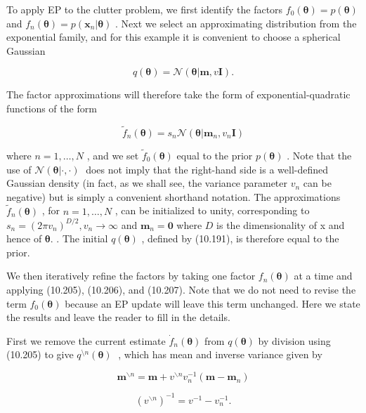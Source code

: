 \documentclass[
  10
]{article}
\begin{document}
To apply EP to the clutter problem, we first identify the factors
\(f _ { 0 } ( \pmb { \theta } ) = p ( \pmb { \theta } )\) and
\(f _ { n } ( \pmb { \theta } ) = p ( \mathbf x _ { n } | \pmb \theta )\)
. Next we select an approximating distribution from the exponential
family, and for this example it is convenient to choose a spherical
Gaussian

\[
q (\boldsymbol {\theta}) = \mathcal {N} (\boldsymbol {\theta} | \mathbf {m}, v \mathbf {I}).\tag{10.212}
\]

The factor approximations will therefore take the form of
exponential-quadratic functions of the form

\[
\widetilde {f} _ {n} (\pmb {\theta}) = s _ {n} \mathcal {N} (\pmb {\theta} | \mathbf {m} _ {n}, v _ {n} \mathbf {I})\tag{10.213}
\]

where \(n = 1 , \ldots , N\) , and we set
\(\widetilde { f } _ { 0 } ( \pmb { \theta } )\) equal to the prior
\(p ( \pmb \theta )\) . Note that the use of
\(\mathcal { N } ( \pmb \theta | \cdot , \cdot )\) does not imply that
the right-hand side is a well-defined Gaussian density (in fact, as we
shall see, the variance parameter \(v _ { n }\) can be negative) but is
simply a convenient shorthand notation. The approximations
\({ \widetilde { f } } _ { n } ( \pmb \theta )\) , for
\(n = 1 , \ldots , N\) , can be initialized to unity, corresponding to
\(s _ { n } = ( 2 \pi v _ { n } ) ^ { D / 2 } , v _ { n } \to \infty\)
and \(\mathbf { m } _ { n } = \mathbf { 0 }\) where \(D\) is the
dimensionality of x and hence of \(\pmb { \theta } .\) . The initial
\(q ( \pmb \theta )\) , defined by (10.191), is therefore equal to the
prior.

We then iteratively refine the factors by taking one factor
\(f _ { n } ( \pmb \theta )\) at a time and applying (10.205), (10.206),
and (10.207). Note that we do not need to revise the term
\(f _ { 0 } ( \pmb { \theta } )\) because an EP update will leave this
term unchanged. Here we state the results and leave the reader to fill
in the details.

First we remove the current estimate
\({ \dot { f } } _ { n } ( \pmb { \theta } )\) from
\(q ( \pmb \theta )\) by division using (10.205) to give
\(q ^ { \setminus n } ( \pmb \theta )\) , which has mean and inverse
variance given by

\[
{\mathbf m} ^ {\backslash n} = {\mathbf m} + v ^ {\backslash n} v _ {n} ^ {- 1} ({\mathbf m} - {\mathbf m} _ {n})\tag{10.214}
\]

\[
(v ^ {\backslash n}) ^ {- 1} = v ^ {- 1} - v _ {n} ^ {- 1}.\tag{10.215}
\]
\end{document}
